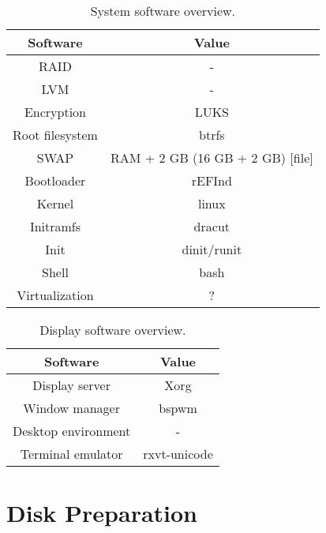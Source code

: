 \documentclass[10pt, a4paper, onecolumn, oneside, titlepage, openany]{book}
\begin{document}
\begin{table}[!ht]
\centering
\begin{tabular}{|c|c|}
    \hline
    \textbf{Software} & \textbf{Value} \\
    \hline
    RAID & -\\
    LVM & -\\
    Encryption & LUKS\\
    Root filesystem & btrfs\\
    SWAP & RAM + 2 GB (16 GB + 2 GB) [file]\\
    Bootloader & rEFInd\\
    Kernel & linux\\
    Initramfs & dracut\\
    Init & dinit/runit\\
    Shell & bash\\
    Virtualization & ?\\
    \hline
\end{tabular}
\caption{System software overview.}
\label{table:3}
\end{table}

\begin{table}[!ht]
\centering
\begin{tabular}{|c|c|}
    \hline
    \textbf{Software} & \textbf{Value} \\
    \hline
    Display server & Xorg\\
    Window manager & bspwm\\
    Desktop environment & -\\
    Terminal emulator & rxvt-unicode\\
    \hline
\end{tabular}
\caption{Display software overview.}
\label{table:4}
\end{table}


\chapter{Disk Preparation}
\end{document}
